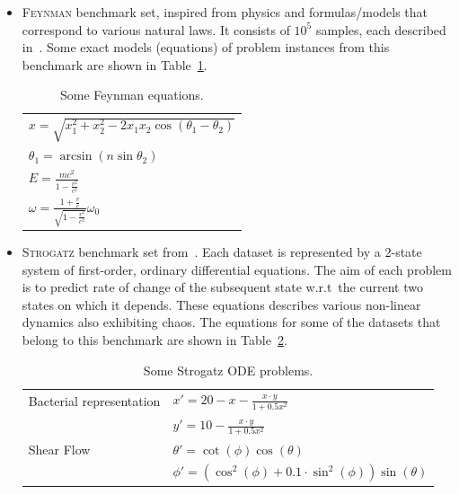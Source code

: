 \documentclass[a4paper,12pt]{elsarticle}
\begin{document}
\begin{itemize}
	\item \textsc{Feynman} benchmark set, inspired from physics and formulas/models that correspond to various natural laws.  
	It consists of $10^5$  samples, each described in~\cite{udrescu2020ai}. Some exact models (equations) of problem instances from this benchmark are shown in Table~\ref{tab:Feynamn-Eq}.  
	
   \begin{table}
		\centering
		\begin{tabular}{l}   \hline
	       $x = \sqrt{x_1^2 + x_2^2 - 2 x_1 x_2 \cos(\theta_1 - \theta_2)}$ \\
	       $ \theta_1 = \arcsin(n \sin \theta_2)$ \\
	       $E =  \frac{m c^2 }{1 - \frac{v^2}{c^2}}$ \\
	       $\omega = \frac{1 + \frac{v}{c}}{ \sqrt{1 - \frac{v^2}{c^2}}} \omega_0$ \\ \hline
	       
	    \end{tabular}
		\caption{Some Feynman equations.}
		\label{tab:Feynamn-Eq}
	\end{table}


	\item \textsc{Strogatz} benchmark set from~\cite{la2016inference}. 
	Each dataset is represented by a 2-state system of first-order, ordinary differential equations. 
	The aim of each problem is to predict rate of change of the subsequent state w.r.t\  the current two states on which it depends. These equations describes various non-linear dynamics also exhibiting chaos.  The equations for some of the datasets that belong to this benchmark are shown in Table~\ref{table:strogatz-ODEs}.
	
	
	\begin{table}
		\centering
		\begin{tabular}{ll} \\ \hline
			Bacterial representation &   $x' = 20 - x - \frac{x \cdot y}{1 + 0.5 x^2 }$ \\ 
			                         &   $y' = 10 - \frac{x \cdot y}{1 + 0.5 x^2  }$ \\ \hline
			Shear Flow               &  $\theta' = \cot(\phi)\cos(\theta)$ \\
			                         &  $ \phi'  = ( \cos^2(\phi) + 0.1 \cdot \sin^2 (\phi)) \sin(\theta) $ \\ \hline
		\end{tabular}
	    \caption{Some Strogatz ODE problems.}
	    \label{table:strogatz-ODEs}
	\end{table}
	 

\end{itemize}
\end{document}

